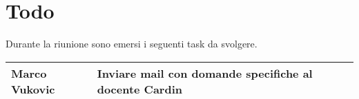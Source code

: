 \section{Todo}
Durante la riunione sono emersi i seguenti task da svolgere.

\begin{center}
  \begin{tabular}{|p{5cm}|p{7cm}|}
    \hline
    Marco Vukovic & Inviare mail con domande specifiche al docente Cardin  \\ \hline
  \end{tabular}
\end{center}
